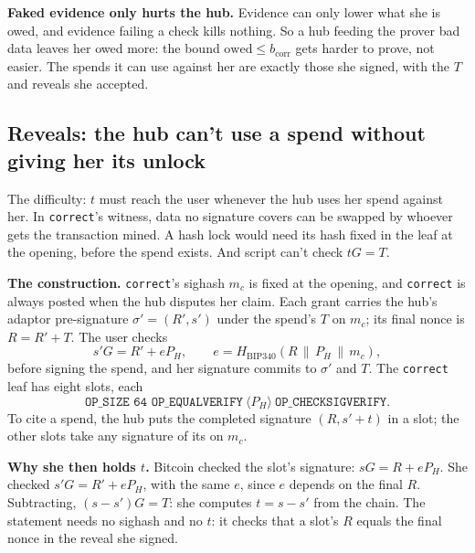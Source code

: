 \documentclass[11pt]{article}
\newcommand{\bcorr}{b_{\mathrm{corr}}}
\newcommand{\tx}[1]{\texttt{#1}}
\begin{document}
\textbf{Faked evidence only hurts the hub.} Evidence can only lower what
she is owed, and evidence failing a check kills nothing. So a hub
feeding the prover bad data leaves her owed more: the bound
$\mathrm{owed} \le \bcorr$ gets harder to prove, not easier. The spends
it can use against her are exactly those she signed, with the $T$ and
reveals she accepted.

\subsection{Reveals: the hub can't use a spend without giving her its
unlock}\label{sec:reveal}

The difficulty: $t$ must reach the user whenever the hub uses her spend
against her. In \tx{correct}'s witness, data no signature covers can be
swapped by whoever gets the transaction mined. A hash lock would need
its hash fixed in the leaf at the opening, before the spend exists. And
script can't check $tG = T$.

\textbf{The construction.} \tx{correct}'s sighash $m_c$ is fixed at the
opening, and \tx{correct} is always posted when the hub disputes her
claim. Each grant carries the hub's adaptor pre-signature
$\sigma' = (R', s')$ under the spend's $T$ on $m_c$; its final nonce is
$R = R' + T$. The user checks
\[
  s'G = R' + eP_H,\qquad e = H_{\text{BIP340}}(R \,\|\, P_H \,\|\, m_c),
\]
before signing the spend, and her signature commits to $\sigma'$ and
$T$. The \tx{correct} leaf has eight slots, each
\[
  \tx{OP\_SIZE 64 OP\_EQUALVERIFY}\ \langle P_H\rangle\ \tx{OP\_CHECKSIGVERIFY}.
\]
To cite a spend, the hub puts the completed signature
$(R, s' + t)$ in a slot; the other slots take any signature of its on
$m_c$.

\textbf{Why she then holds $t$.} Bitcoin checked the slot's signature:
$sG = R + eP_H$. She checked $s'G = R' + eP_H$, with the same $e$,
since $e$ depends on the final $R$. Subtracting, $(s - s')G = T$: she
computes $t = s - s'$ from the chain. The statement needs no sighash and
no $t$: it checks that a slot's $R$ equals the final nonce in the reveal
she signed.
\end{document}
